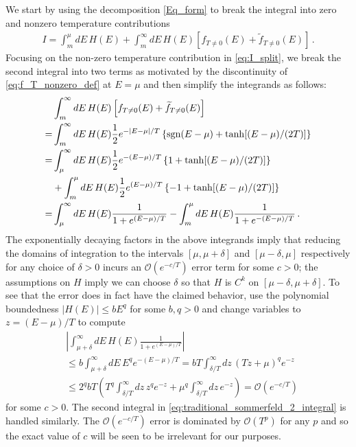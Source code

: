 \documentclass[sn-mathphys,Numbered]{sn-jnl}
\begin{document}
We start by using the decomposition \eqref{Eq_form}  to break the integral into zero and nonzero temperature contributions
\begin{align}\label{eq:I_split}
   I= \int_m^\mu dE\, H(E) +\int_m^\infty dE\, H(E) \left[f_{T\neq 0}(E)+\widetilde{f}_{T\neq 0}(E)\right]\,.
\end{align}
Focusing on the non-zero temperature contribution in \eqref{eq:I_split},  we break the second integral into two terms as motivated by the discontinuity of \eqref{eq:f_T_nonzero_def} at $E=\mu$ and then simplify the integrands as follows:
\begin{align}
   &\int_m^\infty dE\,H(E) \left[f_{T\neq 0}(E)+\widetilde{f}_{T\neq 0}(E)\right]\\
    =  &\int_m^\infty dE\, H(E) \frac{1}{2}e^{-|E-\mu|/T}\left\{\mathrm{sgn}(E-\mu)+\tanh[(E-\mu)/(2T)]\right\}\notag\\
=&\int_\mu^\infty dE\, H(E) \frac{1}{2}e^{-(E-\mu)/T}\left\{1+\tanh[(E-\mu)/(2T)]\right\}\notag\\
&+\int_m^\mu dE\,H(E) \frac{1}{2}e^{(E-\mu)/T}\left\{-1+\tanh[(E-\mu)/(2T)]\right\}\notag\\
=&\int_\mu^\infty dE\, H(E)  \frac{1}{1+e^{(E-\mu)/T}}-\int_m^\mu dE\,H(E) \frac{1}{1+e^{-(E-\mu)/T}}\,.\label{eq:traditional_sommerfeld_2_integral}
\end{align}
The exponentially decaying factors in the above integrands imply that  reducing the domains of integration to the intervals $[\mu,\mu+\delta]$ and $[\mu-\delta,\mu]$ respectively for any choice of $\delta>0$ incurs an   $\mathcal{O}(e^{-c/T})$ error term for some $c>0$; the assumptions on $H$ imply we can choose $\delta$ so that $H$ is $C^k$ on $[\mu-\delta,\mu+\delta]$.  To see that the error does in fact have the claimed behavior, use the polynomial boundedness $|H(E)|\leq bE^q$ for some $b,q>0$ and change variables to $z=(E-\mu)/T$ to compute
\begin{equation}\label{eq:change_limits_int_exponential_decay}
    \begin{split}
    &\left|\int_{\mu+\delta}^\infty dE\, H(E)\frac{1}{1+e^{(E-\mu)/T}}\right|\\
    &\leq b\int_{\mu+\delta}^\infty dE\,E^q e^{-(E-\mu)/T} = bT\int_{\delta/T}^\infty dz\,(Tz+\mu)^q e^{-z}\\
    &\leq 2^qbT\left(T^q \int_{\delta/T}^\infty dz\,z^q e^{-z}+\mu^q \int_{\delta/T}^\infty dz\,e^{-z}\right) =\mathcal{O}\left(e^{-c/T}\right)
    \end{split}
\end{equation}
for some $c>0$. The second integral in \eqref{eq:traditional_sommerfeld_2_integral} is handled similarly.   The $\mathcal{O}(e^{-c/T})$ error is dominated by  $\mathcal{O}(T^{p})$ for any $p$ and so the exact value of $c$ will be seen to be irrelevant for our purposes.
\end{document}
